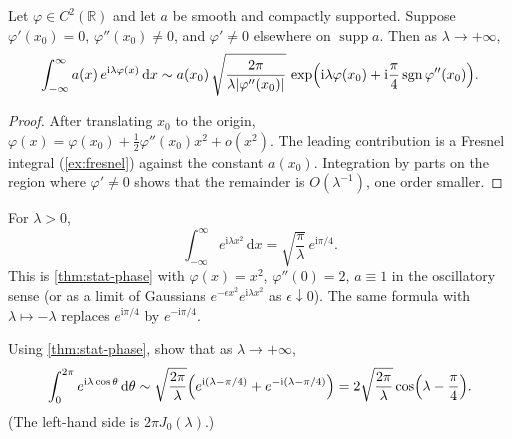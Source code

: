 \documentclass[11pt,a4paper]{article}
\begin{document}
\begin{theorem}
\label{thm:stat-phase}
Let \(\varphi\in C^{2}(\mathbb{R})\) and let \(a\) be smooth and compactly supported. Suppose \(\varphi'(x_{0})=0\), \(\varphi''(x_{0})\neq 0\), and \(\varphi'\neq 0\) elsewhere on \(\operatorname{supp}a\). Then as \(\lambda\to+\infty\),
\[
\int_{-\infty}^{\infty}a(x)\,e^{\mathrm{i}\lambda\varphi(x)}\,\mathrm{d}x
\sim
a(x_{0})\,
\sqrt{\frac{2\pi}{\lambda\lvert\varphi''(x_{0})\rvert}}\,
\exp\Bigl(\mathrm{i}\lambda\varphi(x_{0})+\mathrm{i}\frac{\pi}{4}\operatorname{sgn}\varphi''(x_{0})\Bigr).
\]
\end{theorem}

\begin{proof}
After translating \(x_{0}\) to the origin, \(\varphi(x)=\varphi(x_{0})+\frac12\varphi''(x_{0})x^{2}+o(x^{2})\). The leading contribution is a Fresnel integral (\cref{ex:fresnel}) against the constant \(a(x_{0})\). Integration by parts on the region where \(\varphi'\neq 0\) shows that the remainder is \(O(\lambda^{-1})\), one order smaller.
\end{proof}

\begin{example}
\label{ex:fresnel}
For \(\lambda>0\),
\[
\int_{-\infty}^{\infty}e^{\mathrm{i}\lambda x^{2}}\,\mathrm{d}x
=
\sqrt{\frac{\pi}{\lambda}}\,e^{\mathrm{i}\pi/4}.
\]
This is \cref{thm:stat-phase} with \(\varphi(x)=x^{2}\), \(\varphi''(0)=2\), \(a\equiv 1\) in the oscillatory sense (or as a limit of Gaussians \(e^{-\epsilon x^{2}}e^{\mathrm{i}\lambda x^{2}}\) as \(\epsilon\downarrow 0\)). The same formula with \(\lambda\mapsto-\lambda\) replaces \(e^{\mathrm{i}\pi/4}\) by \(e^{-\mathrm{i}\pi/4}\).
\end{example}

\begin{exercise}
\label{exer:bessel-phase}
Using \cref{thm:stat-phase}, show that as \(\lambda\to+\infty\),
\[
\int_{0}^{2\pi}e^{\mathrm{i}\lambda\cos\theta}\,\mathrm{d}\theta
\sim
\sqrt{\frac{2\pi}{\lambda}}
\Bigl(
e^{\mathrm{i}(\lambda-\pi/4)}
+
e^{-\mathrm{i}(\lambda-\pi/4)}
\Bigr)
=
2\sqrt{\frac{2\pi}{\lambda}}\cos\Bigl(\lambda-\frac{\pi}{4}\Bigr).
\]
(The left-hand side is \(2\pi J_{0}(\lambda)\).)
\end{exercise}
\end{document}
